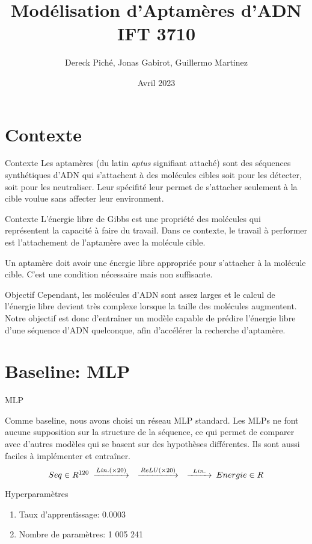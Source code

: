\documentclass{beamer}
\title{Modélisation d'Aptamères d'ADN IFT 3710}
\author{Dereck Piché, Jonas Gabirot, Guillermo Martinez}
\institute{Université de Montréal}
\date{Avril 2023}
\begin{document}
\frame{\titlepage}

\section{Contexte}

\begin{frame}{Contexte}
Les aptamères (du latin \emph{aptus} signifiant attaché) sont des séquences synthétiques d'ADN qui s'attachent à des molécules cibles soit pour les détecter, soit pour les neutraliser. Leur spécifité leur permet de s'attacher seulement à la cible voulue sans affecter leur environment.
\end{frame}


\begin{frame}{Contexte}
L'énergie libre de Gibbs est une propriété des molécules qui représentent la capacité à faire du travail. Dans ce contexte, le travail à performer est l'attachement de l'aptamère avec la molécule cible. 

Un aptamère doit avoir une énergie libre appropriée pour s'attacher à la molécule cible. C'est une condition nécessaire mais non suffisante.
\end{frame}


\begin{frame}{Objectif}
Cependant, les molécules d'ADN sont assez larges et le calcul de l'énergie libre devient très complexe lorsque la taille des molécules augmentent. Notre objectif est donc d'entraîner un modèle capable de prédire l'énergie libre d'une séquence d'ADN quelconque, afin d'accélérer la recherche d'aptamère.
\end{frame}

\section{Baseline: MLP}
\begin{frame}{MLP}

Comme baseline, nous avons choisi un réseau MLP standard. Les MLPs ne font aucune supposition sur la structure de la séquence, ce qui permet de comparer avec d'autres modèles qui se basent sur des hypothèses différentes. Ils sont aussi faciles à implémenter et entraîner. 
\begin{equation*}
    \begin{CD}
        @. Seq \in R^{120}
        @>Lin. (\times 20)>> 
        @>ReLU (\times 20)>> 
        @>Lin.>> 
        Energie \in R
    \end{CD}
\end{equation*}

\begin{block}{Hyperparamètres}
\begin{enumerate}
    \item Taux d'apprentissage: 0.0003
    \item Nombre de paramètres: 1 005 241
\end{enumerate}
\end{block}

\end{frame}
\end{document}
